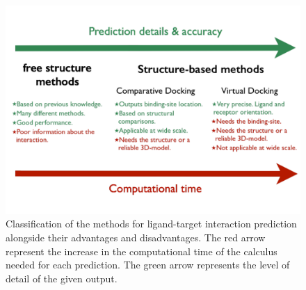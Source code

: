 \documentclass[11pt, b5paper,twoside]{tesi_upf}
\begin{document}
\begin{figure}[htbp]

  \centering
  	\includegraphics[width=\textwidth]{../figures/type_of_methods.pdf} %

	\caption[Type of computational methods for ligand-target interaction prediction]{Classification of the methods for ligand-target interaction prediction alongside their advantages and disadvantages. The red arrow represent the increase in the computational time of the calculus needed for each prediction. The green arrow represents the level of detail of the given output.}
	\label{fig:type_ligandtarget_methods}
\end{figure}
\end{document}
